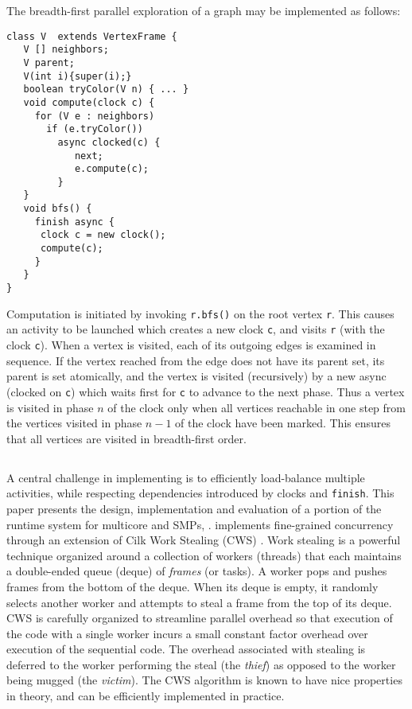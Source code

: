 \begin{example}[BFS] \label{example:bfs}
The breadth-first parallel exploration of a graph may be implemented
as follows:
{\footnotesize
\begin{verbatim}
class V  extends VertexFrame {
   V [] neighbors;
   V parent;
   V(int i){super(i);}
   boolean tryColor(V n) { ... }
   void compute(clock c) {
     for (V e : neighbors) 
       if (e.tryColor()) 
         async clocked(c) { 
            next; 
            e.compute(c);
         }
   }
   void bfs() {
     finish async {
      clock c = new clock();
      compute(c);
     }
   }
}
\end{verbatim}}
Computation is initiated by invoking {\tt r.bfs()} on the root vertex
{\tt r}. This causes an activity to be launched which creates a new
clock {\tt c}, and visits {\tt r} (with the clock {\tt c}).  When a
vertex is visited, each of its outgoing edges is examined in sequence.
If the vertex reached from the edge does not have its parent set, its
parent is set atomically, and the vertex is visited (recursively) by a
new async (clocked on {\tt c}) which waits first for {\tt c} to
advance to the next phase.  Thus a vertex is visited in phase $n$ of
the clock only when all vertices reachable in one step from the
vertices visited in phase $n-1$ of the clock have been marked. This
ensures that all vertices are visited in breadth-first order.
\end{example}
\subsection{\XWS}
A central challenge in implementing \Xten{} is to efficiently
load-balance multiple activities, while respecting dependencies
introduced by clocks and {\tt finish}. This paper presents the design,
implementation and evaluation of a portion of the \Xten{} runtime
system for multicore and SMPs, \XWS{}. \XWS{} implements fine-grained
concurrency through an extension of Cilk Work Stealing (CWS)
\cite{BJKLRZ95}.  Work stealing is a powerful technique organized
around a collection of workers (threads) that each maintains a
double-ended queue (deque) of {\em frames} (or tasks). A worker pops
and pushes frames from the bottom of the deque. When its deque is
empty, it randomly selects another worker and attempts to steal a
frame from the top of its deque. CWS is carefully organized to
streamline parallel overhead so that execution of the code with a
single worker incurs a small constant factor overhead over execution
of the sequential code. The overhead associated with stealing is
deferred to the worker performing the steal (the {\em thief}) as
opposed to the worker being mugged (the {\em victim}). The CWS
algorithm is known to have nice properties in theory, and can be
efficiently implemented in practice.

